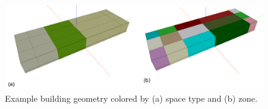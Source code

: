 \begin{figure}[hb!]
\centering \includegraphics[width=1\textwidth]{figures/geometry_by_space_type_and_zone.png}
\caption[Example building geometry]{Example building geometry colored by (a) space type and (b) zone.}
\label{fig:geometry_by_space_type_and_zone}
\end{figure} 